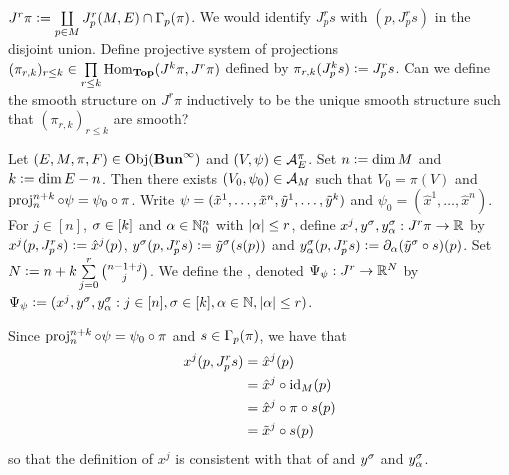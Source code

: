 \documentclass{book}
\begin{document}
\vspace{5cm}

$J^r \pi \vcentcolon= \coprod\limits_{p \in M} J^r_p(M, E) \cap \Gamma_p(\pi)$. We would identify $J^r_p s$ with $(p, J^r_p s)$ in the disjoint union. Define projective system of projections $(\pi_{r,k})_{r \leq k} \in \prod\limits_{r \leq k} \operatorname{Hom}_{\operatorname*{\text{\textbf{Top}}}}(J^k \pi, J^r \pi)$ defined by $\pi_{r, k}(J^k_p s) \vcentcolon= J^r_p s$. Can we define the smooth structure on $J^r \pi$ inductively to be the unique smooth structure such that $(\pi_{r, k})_{r \leq k}$ are smooth? 



\vspace{5cm}




\begin{defn}
	Let $(E, M, \pi, F) \in \operatorname{Obj}(\operatorname*{\text{\textbf{Bun}}^{\infty}})$ and $(V, \psi) \in \mathcal{A}_E^{\pi}$. Set $n \vcentcolon= \dim M$ and $k \vcentcolon= \dim E - n$. Then there exists $(V_0, \psi_0) \in \mathcal{A}_M$ such that $V_0 = \pi(V)$ and $\operatorname{\text{proj}}^{n+k}_{n} \circ \psi = \psi_0 \circ \pi$. Write $\psi = (\tilde{x}^1, \ldots, \tilde{x}^n, \tilde{y}^1, \ldots, \tilde{y}^k)$ and $\psi_0 = (\hat{x}^1, \ldots, \hat{x}^n)$. For $j \in [n]$, $\sigma \in [k]$ and $\alpha \in \mathbb{N}_0^{n}$ with $|\alpha| \leq r$, define $x^j, y^{\sigma}, y^{\sigma}_{\alpha}: J^r \pi \rightarrow \mathbb{R}$ by $x^j(p, J^r_p s) \vcentcolon= \hat{x}^j(p)$, $y^{\sigma}(p, J^r_p s) \vcentcolon= \tilde{y}^{\sigma}(s(p))$ and $y^{\sigma}_{\alpha}(p, J^r_p s) \vcentcolon= \partial_{\alpha} (\tilde{y}^{\sigma} \circ s) (p)$. Set $N \vcentcolon= n  + k \sum\limits_{j=0}^r {n-1 + j \choose j} $. We define the , denoted $\Psi_{\psi}: J^r \rightarrow \mathbb{R}^{N}$ by $\Psi_{\psi} \vcentcolon= (x^j, y^{\sigma}, y^{\sigma}_{\alpha}: j \in [n], \sigma \in [k], \alpha \in \mathbb{N}, |\alpha| \leq r)$.
\end{defn}

\begin{note}
	Since $\operatorname{\text{proj}}^{n+k}_{n} \circ \psi = \psi_0 \circ \pi$ and $s \in \Gamma_p(\pi)$, we have that 
	\begin{align*}
		x^j(p, J^r_p s)
		& = \hat{x}^j(p) \\
		& = \hat{x}^j \circ \operatorname{id}_M (p) \\
		& = \hat{x}^j \circ \pi \circ s (p) \\
		& = \tilde{x}^j \circ s (p)
	\end{align*}
	so that the definition of $x^j$ is consistent with that of and $y^{\sigma}$ and $y^{\sigma}_{\alpha}$.
\end{note}
\end{document}
